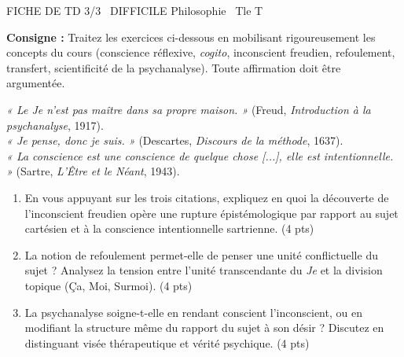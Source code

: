 \documentclass[11pt]{article}
\begin{document}
\begin{tcolorbox}[enhanced,colback=popink,colframe=popink,arc=10pt,boxrule=0pt,left=12pt,right=12pt,top=9pt,bottom=9pt]
{\color{white}\popxbold\small FICHE DE TD 3/3 \textbullet\ DIFFICILE \hfill Philosophie \textbullet\ Tle T\par}
\end{tcolorbox}
\vspace{4pt}
\noindent\textbf{Consigne :} Traitez les exercices ci-dessous en mobilisant rigoureusement les concepts du cours (conscience réflexive, \textit{cogito}, inconscient freudien, refoulement, transfert, scientificité de la psychanalyse). Toute affirmation doit être argumentée.

\begin{exercice}
\emph{« Le \textit{Je} n'est pas maître dans sa propre maison. »} (Freud, \textit{Introduction à la psychanalyse}, 1917).\\
\emph{« Je pense, donc je suis. »} (Descartes, \textit{Discours de la méthode}, 1637).\\
\emph{« La conscience est une conscience de quelque chose [...], elle est intentionnelle. »} (Sartre, \textit{L'Être et le Néant}, 1943).
\begin{enumerate}
    \item En vous appuyant sur les trois citations, expliquez en quoi la découverte de l'inconscient freudien opère une \og rupture épistémologique \fg{} par rapport au sujet cartésien et à la conscience intentionnelle sartrienne. (4 pts)
    \item La notion de \og refoulement \fg{} permet-elle de penser une \og unité conflictuelle \fg{} du sujet ? Analysez la tension entre l'unité transcendante du \textit{Je} et la division topique (Ça, Moi, Surmoi). (4 pts)
    \item \og La psychanalyse soigne-t-elle en rendant conscient l'inconscient, ou en modifiant la structure même du rapport du sujet à son désir ? \fg{} Discutez en distinguant visée thérapeutique et vérité psychique. (4 pts)
\end{enumerate}
\end{exercice}
\end{document}
